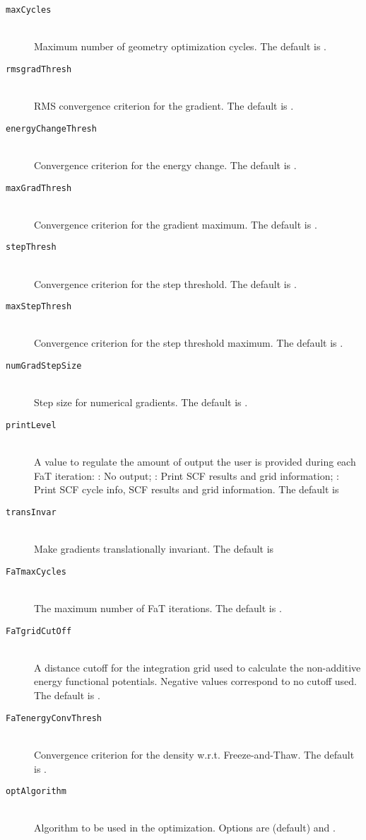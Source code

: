 \begin{description}
 \item [\texttt{maxCycles}]\hfill \\
   Maximum number of geometry optimization cycles. The default is .
 \item [\texttt{rmsgradThresh}]\hfill \\
   RMS convergence criterion for the gradient. The default is . 
 \item [\texttt{energyChangeThresh}]\hfill \\
   Convergence criterion for the energy change. The default is . 
 \item [\texttt{maxGradThresh}]\hfill \\ 
   Convergence criterion for the gradient maximum. The default is . 
 \item [\texttt{stepThresh}]\hfill \\
   Convergence criterion for the step threshold. The default is . 
 \item [\texttt{maxStepThresh}]\hfill \\
   Convergence criterion for the step threshold maximum. The default is . 
 \item [\texttt{numGradStepSize}]\hfill \\
   Step size for numerical gradients. The default is . 
 \item [\texttt{printLevel}]\hfill \\
   A value to regulate the amount of output the user is provided during each FaT iteration:
   : No output; : Print SCF results and grid information; : Print SCF cycle info, SCF results and grid information. The default is 
 \item [\texttt{transInvar}]\hfill \\
   Make gradients translationally invariant. The default is 
 \item [\texttt{FaTmaxCycles}]\hfill \\
   The maximum number of FaT iterations. The default is .
 \item [\texttt{FaTgridCutOff}]\hfill \\
   A distance cutoff for the integration grid used to calculate the non-additive energy functional potentials. Negative values correspond to no cutoff used. The default is .
 \item [\texttt{FaTenergyConvThresh}]\hfill \\
 Convergence criterion for the density w.r.t. Freeze-and-Thaw. The default is .
 \item [\texttt{optAlgorithm}]\hfill \\
  Algorithm to be used in the optimization. Options are  (default) and .
\end{description}
